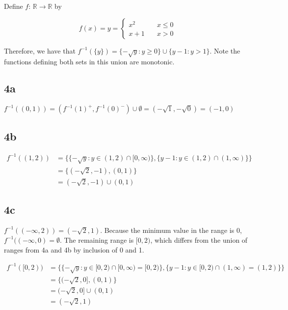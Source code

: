 \documentclass{article}
\begin{document}
Define $f$: $\mathbb{R} \rightarrow \mathbb{R}$ by 

\begin{equation*}
  f(x) = y = \left\{
    \begin{array}{ll}
      x^2 &\quad x \le 0 \\
    x + 1 &\quad x > 0
    \end{array}
    \right.
  \end{equation*}

  Therefore, we have that $f^{-1}(\{y\}) = \{-\sqrt{y}: y \ge 0\} \cup \{y - 1: y > 1\}$. Note the functions defining both sets in this union are monotonic. 

  \subsection*{4a}

  $f^{-1}((0, 1)) = (f^{-1}(1)^+,f^{-1}(0)^-) \cup \emptyset = (-\sqrt{1}, -\sqrt{0}) = (-1, 0)$
  
  \subsection*{4b}

\begin{align*}
  f^{-1}((1, 2)) &= \{\{-\sqrt{y}: y \in (1, 2) \cap [0, \infty)\}, \{y - 1: y \in (1, 2) \cap (1, \infty)\}\} \\
  &= \{(-\sqrt{2}, -1), (0, 1)\} \\
  &= (-\sqrt{2}, -1) \cup (0, 1)
\end{align*}

\subsection*{4c}

$f^{-1}((-\infty, 2)) = (-\sqrt{2}, 1)$. Because the minimum value in the range is 0, $f^{-1}((-\infty, 0) = \emptyset$. 
The remaining range is $[0, 2)$, which differs from the union of ranges from 4a and 4b by inclusion of 0 and 1.

\begin{align*}
  f^{-1}([0, 2)) &= \{\{-\sqrt{y}: y\in [0, 2) \cap [0, \infty) = [0, 2)\}, \{y - 1: y \in [0, 2) \cap (1, \infty) = (1, 2)\}\} \\
&= \{(-\sqrt{2}, 0], (0, 1)\} \\
  &= (-\sqrt{2}, 0] \cup (0, 1) \\
  &= (-\sqrt{2}, 1)
\end{align*}
    
\end{document}
